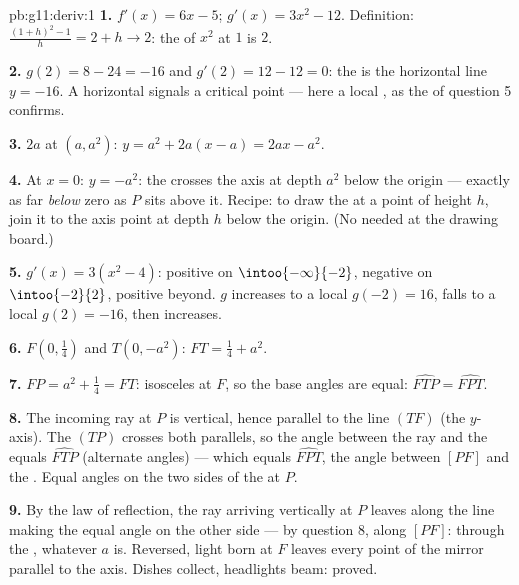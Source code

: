 \begin{solution}{pb:g11:deriv:1}
\textbf{1.} $f'(x) = 6x - 5$; $g'(x) = 3x^2 - 12$. Definition:
$\frac{(1 + h)^2 - 1}{h} = 2 + h \to 2$: the  of
$x^2$ at $1$ is $2$.

\textbf{2.} $g(2) = 8 - 24 = -16$ and $g'(2) = 12 - 12 = 0$:
the  is the horizontal line $y = -16$. A horizontal
 signals a critical point --- here a local , as
the  of question 5 confirms.

\textbf{3.}  $2a$ at $(a, a^2)$:
$y = a^2 + 2a(x - a) = 2ax - a^2$.

\textbf{4.} At $x = 0$: $y = -a^2$: the  crosses the
axis at depth $a^2$ below the origin --- exactly as far
\emph{below} zero as $P$ sits above it. Recipe: to draw the
 at a point of height $h$, join it to the axis point at
depth $h$ below the origin. (No  needed at the
drawing board.)

\textbf{5.} $g'(x) = 3(x^2 - 4)$: positive on
$\intoo{-\infty}{-2}$, negative on $\intoo{-2}{2}$, positive
beyond. $g$ increases to a local  $g(-2) = 16$, falls
to a local  $g(2) = -16$, then increases.

\textbf{6.} $F\left(0, \frac14\right)$ and $T(0, -a^2)$:
$FT = \frac14 + a^2$.

\textbf{7.} $FP = a^2 + \frac14 = FT$: isosceles at $F$, so the
base angles are equal: $\widehat{FTP} = \widehat{FPT}$.

\textbf{8.} The incoming ray at $P$ is vertical, hence parallel
to the line $(TF)$ (the $y$-axis). The  $(TP)$ crosses
both parallels, so the angle between the ray and the 
equals $\widehat{FTP}$ (alternate angles) --- which equals
$\widehat{FPT}$, the angle between $[PF]$ and the .
Equal angles on the two sides of the  at $P$.

\textbf{9.} By the law of reflection, the ray arriving
vertically at $P$ leaves along the line making the equal angle
on the other side --- by question 8, along $[PF]$: through the
, whatever $a$ is. Reversed, light born at $F$ leaves
every point of the mirror parallel to the axis. Dishes collect,
headlights beam: proved.


\end{solution}
